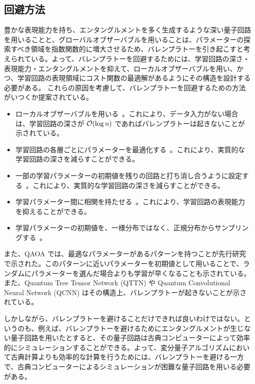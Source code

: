 \subsection{回避方法}
豊かな表現能力を持ち、エンタングルメントを多く生成するような深い量子回路を用いることと、グローバルオブザーバブルを用いることは、パラメーターの探索すべき領域を指数関数的に増大させるため、バレンプラトーを引き起こすと考えられている。よって、バレンプラトーを回避するためには、学習回路の深さ・表現能力・エンタングルメントを抑えて、ローカルオブザーバブルを用い、かつ、学習回路の表現領域にコスト関数の最適解があるようにその構造を設計する必要がある。
これらの原因を考慮して、バレンプラトーを回避するための方法がいつくか提案されている。
\begin{itemize}
    \item ローカルオブザーバブルを用いる~\cite{cerezo2021cost}。これにより、データ入力がない場合は、学習回路の深さが $\order{\log{n}}$ であればバレンプラトーは起きないことが示されている。
    \item 学習回路の各層ごとにパラメーターを最適化する~\cite{skolik2021layerwise}。これにより、実質的な学習回路の深さを減らすことができる。
    \item 一部の学習パラメーターの初期値を残りの回路と打ち消し合うように設定する~\cite{grant2019initialization}。これにより、実質的な学習回路の深さを減らすことができる。
    \item 学習パラメーター間に相関を持たせる~\cite{holmes2022connecting}。これにより、学習回路の表現能力を抑えることができる。
    \item 学習パラメーターの初期値を、一様分布ではなく、正規分布からサンプリングする~\cite{zhang2022escaping}。
\end{itemize}

また、QAOA では、最適なパラメーターがあるパターンを持つことが先行研究\cite{zhou2020quantum}で示された。このパターンに近いパラメーターを初期値として用いることで、ランダムにパラメーターを選んだ場合よりも学習が早くなることも示されている。
また、Quantum Tree Tensor Network (QTTN) や Quantum Convolutional Neural Network (QCNN) はその構造上、バレンプラトーが起きないことが示されている\cite{cong2019quantum,martin2022barren}。

しかしながら、バレンプラトーを避けることだけできれば良いわけではない。というのも、例えば、バレンプラトーを避けるためにエンタングルメントが生じない量子回路を用いたとすると、その量子回路は古典コンピューターによって効率的にシミュレーションすることができる。よって、変分量子アルゴリズムにおいて古典計算よりも効率的な計算を行うためには、バレンプラトーを避ける一方で、古典コンピューターによるシミュレーションが困難な量子回路を用いる必要がある。
